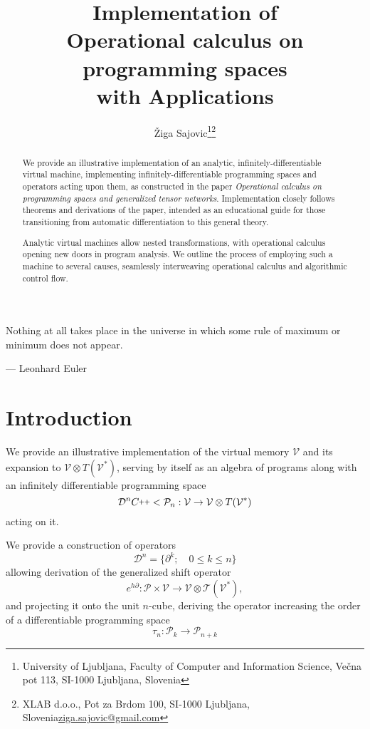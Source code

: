 \documentclass{article}
\title{Implementation of \\ Operational calculus on programming spaces \\ with Applications}
\author{Žiga Sajovic\footnote{University of Ljubljana, Faculty of Computer and Information
  Science,  Večna pot 113, SI-1000 Ljubljana, Slovenia}\footnote{XLAB d.o.o., Pot za Brdom 100, SI-1000 Ljubljana, Slovenia\newline \href{mail.to:ziga.sajovic@xlab.si}{ziga.sajovic@gmail.com}}}
\newcommand{\T}{\mathcal{T}}
\newcommand{\VV}{\mathcal{V}}
\newcommand{\CC}{C\nolinebreak\hspace{-.05em}\raisebox{.4ex}{\tiny\bf +}\nolinebreak\hspace{-.10em}\raisebox{.4ex}{\tiny\bf +}}
\def\CC{{C\nolinebreak[4]\hspace{-.05em}\raisebox{.4ex}{\tiny\bf ++}}}
\newcommand{\dP}{\mathcal{P}}
\newcommand{\D}{\partial}
\newcommand{\DD}{\mathcal{D}}
\newcommand{\sumd}{\tau}
\begin{document}
\maketitle

\begin{abstract}
We provide an illustrative implementation of an analytic, infinitely-differentiable virtual machine, implementing infinitely-differentiable programming spaces and operators acting upon them, as constructed in the paper \emph{Operational calculus on programming spaces and generalized tensor networks}\cite{OperationalCalculus}. Implementation closely follows theorems and derivations of the paper, intended as an educational guide for those transitioning from automatic differentiation to this general theory.

Analytic virtual machines allow nested transformations, with operational calculus opening new doors in program analysis. We outline the process of employing such a machine to several causes, seamlessly interweaving operational calculus and algorithmic control flow. 
\end{abstract}

\epigraph{Nothing at all takes place in the universe in which some rule of maximum or minimum does not appear.}{--- \textup{Leonhard Euler}}

\clearpage

\tableofcontents
\clearpage
\section{Introduction}\label{sec:introduction}
We provide an illustrative implementation of the virtual memory $\VV$ and its expansion to $\VV\otimes T(\VV^*)$, serving by itself as an algebra of programs along with an infinitely differentiable programming space \cite[Theorem~5.1]{OperationalCalculus}
\begin{equation}
\DD^n\CC<\dP_n:\VV\to\VV\otimes T(\VV^*)
\end{equation}
acting on it.

We provide a construction of operators
\begin{equation}
\DD^n=\{\D^k;\quad 0\le k\le n\}
\end{equation}
allowing derivation of the generalized shift operator \cite[Theorem~5.4]{OperationalCalculus}
 \begin{equation}
                  	e^{h\D}:\dP\times \VV\to \VV\otimes \T(\VV^*),
         \end{equation}
and projecting it onto the unit $n$-cube, deriving the operator increasing the order of a differentiable programming space \cite[Corollary~5.2]{OperationalCalculus}
\begin{equation}\label{eq:sumd}
\sumd_n:\dP_k\to\dP_{n+k}
\end{equation} 
\end{document}
